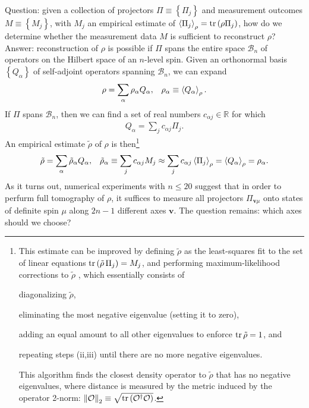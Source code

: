 \documentclass[nofootinbib,notitlepage,11pt]{revtex4-2}
\newcommand{\p}[1]{\left(#1\right)} %
\renewcommand{\set}[1]{\left\{#1\right\}} %
\newcommand{\bk}{\Braket} %
\renewcommand{\v}{\bm} %
\newcommand{\1}{\mathds{1}}
\newcommand{\B}{\mathcal{B}}
\renewcommand{\O}{\mathcal{O}}
\newcommand{\RR}{\mathbb{R}}
\begin{document}
Question: given a collection of projectors $\Pi\equiv\set{\Pi_j}$ and measurement outcomes $M\equiv\set{M_j}$, with $M_j$ an empirical estimate of $\bk{\Pi_j}_\rho=\tr\p{\rho\Pi_j}$, how do we determine whether the measurement data $M$ is sufficient to reconstruct $\rho$?
Answer: reconstruction of $\rho$ is possible if $\Pi$ spans the entire space $\B_n$ of operators on the Hilbert space of an $n$-level spin.
Given an orthonormal basis $\set{Q_\alpha}$ of self-adjoint operators spanning $\B_n$, we can expand
\begin{align}
  \rho = \sum_\alpha \rho_\alpha Q_\alpha,
  &&
  \rho_\alpha \equiv \bk{Q_\alpha}_\rho.
\end{align}
If $\Pi$ spans $\B_n$, then we can find a set of real numbers $c_{\alpha j}\in\RR$ for which
\begin{align}
  Q_\alpha = \sum_j c_{\alpha j} \Pi_j.
\end{align}
An empirical estimate $\tilde\rho$ of $\rho$ is then\footnote{This estimate can be improved by defining $\tilde\rho$ as the least-squares fit to the set of linear equations $\tr\p{\tilde\rho\,\Pi_j} = M_j$, and performing maximum-likelihood corrections to $\tilde\rho$ \cite{smolin2012efficient}, which essentially consists of
\begin{enumerate*}
\item diagonalizing $\tilde\rho$,
\item eliminating the most negative eigenvalue (setting it to zero),
\item adding an equal amount to all other eigenvalues to enforce $\tr\tilde\rho=1$, and
\item repeating steps (ii,iii) until there are no more negative eigenvalues.
\end{enumerate*}
This algorithm finds the closest density operator to $\tilde\rho$ that has no negative eigenvalues, where distance is measured by the metric induced by the operator 2-norm: $\norm{\O}_2\equiv\sqrt{\tr\p{\O^\dag \O}}$.}
\begin{align}
  \tilde\rho = \sum_\alpha \tilde\rho_\alpha Q_\alpha,
  &&
  \tilde\rho_\alpha \equiv \sum_j c_{\alpha j} M_j
  \approx \sum_j c_{\alpha j} \bk{\Pi_j}_\rho
  = \bk{Q_\alpha}_\rho
  = \rho_\alpha.
\end{align}
As it turns out, numerical experiments with $n\le20$ suggest that in order to perfurm full tomography of $\rho$, it suffices to measure all projectors $\Pi_{\v v\mu}$ onto states of definite spin $\mu$ along $2n-1$ different axes $\v v$.
The question remains: which axes should we choose?
\end{document}
